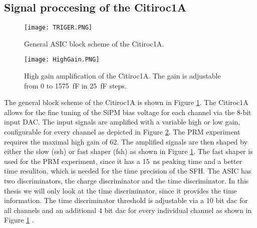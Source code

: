 \subsection{Signal proccesing of the Citiroc1A}
\begin{figure}[h]
    \centering
    \texttt{[image: TRIGER.PNG]}
    \caption{General ASIC block scheme of the Citiroc1A. \autocite{datasheetCITIROC}}
    \label{fig:CITIROC1A_TRIGEER}
\end{figure}

\begin{figure}[h]
    \centering
    \texttt{[image: HighGain.PNG]}
    \caption{High gain amplification of the Citiroc1A. The gain is adjustable from 0 to \SI{1575}{\femto\farad} in \SI{25}{\femto\farad} steps.\autocite{datasheetCITIROC}}
    \label{HighGain}
\end{figure}
The general block scheme of the Citiroc1A is shown in Figure \ref{fig:CITIROC1A_TRIGEER}.
\newline
The Citiroc1A allows for the fine tuning of the SiPM bias voltage for each channel via the 8-bit input DAC.
\newline	
The input signals are amplified with a variable high or low gain, configurable for every channel as depicted in Figure \ref{HighGain}. 
The PRM experiment requires the maximal high gain of 62.\autocite{InternalcommunicationIgor}
\newline
The amplified signals are then shaped by either the slow (ssh) or fast shaper (fsh) as shown in Figure \ref{fig:CITIROC1A_TRIGEER}. 
The fast shaper is used for the PRM experiment, since it has a \SI{15}{\nano\second} peaking time and a better time resuliton, which is needed for the time precision of the SFH.\autocite{datasheetCITIROC}
\newline
The ASIC has two discriminators, the charge discriminator and the time discriminator. In this thesis we will only look at the time discriminator,
 since it provides the time information.
The time discriminator threshold is adjustable via a 10 bit dac for all channels and an additional 4 bit dac for every individual channel as shown in Figure \ref{fig:CITIROC1A_TRIGEER} \autocite{datasheetCITIROC}.


